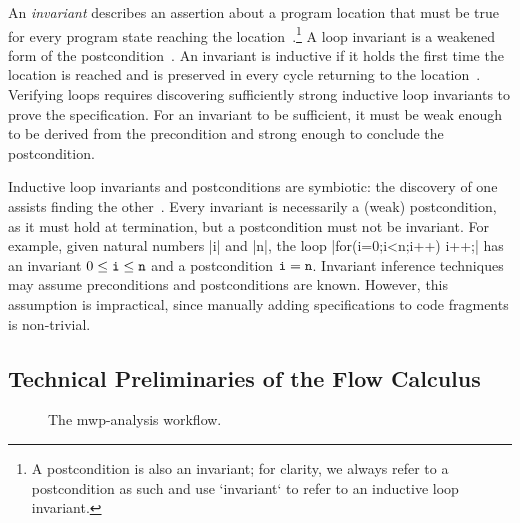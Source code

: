 An \emph{invariant} describes an assertion about a program location that must be true for every program state reaching the location~\cite{furia2010,nguyen2022}.\footnote{A postcondition is also an invariant; for clarity, we always refer to a postcondition as such and use `invariant` to refer to an inductive loop invariant.}
A {loop invariant} is a weakened form of the postcondition~\cite{furia2010}.
An invariant is {inductive} if it holds the first time the location is reached and is preserved in every cycle returning to the location~\cite{sankaranarayanan2004}.
Verifying loops requires discovering {sufficiently strong} inductive loop invariants to prove the specification.
For an invariant to be sufficient, it must be weak enough to be derived from the precondition and strong enough to conclude the postcondition.

Inductive loop invariants and postconditions are symbiotic: the discovery of one assists finding the other~\cite{furia2010}.
Every invariant is necessarily a (weak) postcondition, as it must hold at termination, but a postcondition must not be invariant.
For example, given natural numbers \pr|i| and \pr|n|, the loop \prc|for(i=0;i<n;i++) i++;| has an invariant \(0 \leq \prm{i} \leq \prm{n}\) and a postcondition \(\prm{i}=\prm{n}\).
Invariant inference techniques may assume preconditions and postconditions are known.
However, this assumption is impractical, since manually adding specifications to code fragments is non-trivial.

\subsection{Technical Preliminaries of the Flow Calculus}
\label{sec:calc}

\begin{figure}[H]
\centering
{}

\caption[The mwp-analysis workflow]{The mwp-analysis workflow.}
\label{fig:pc-workflow}
\end{figure}

